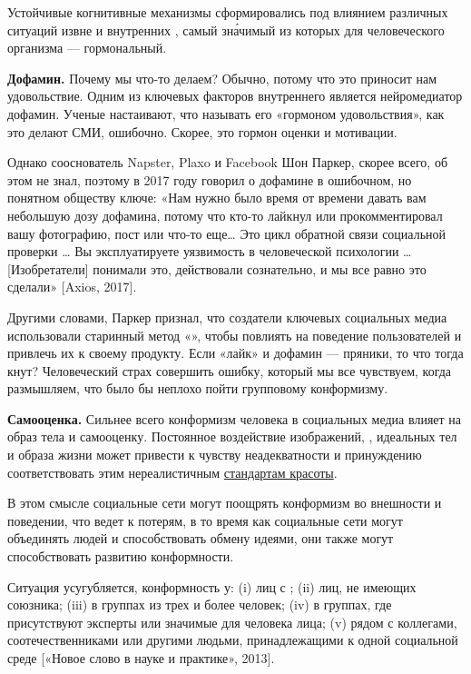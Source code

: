 Устойчивые когнитивные механизмы сформировались под влиянием различных ситуаций извне и внутренних , самый зн\'{а}чимый из которых для человеческого организма --- гормональный.

\textbf{Дофамин.}
Почему мы что-то делаем? Обычно, потому что это приносит нам удовольствие. Одним из ключевых факторов внутреннего  является нейромедиатор дофамин. Ученые настаивают, что называть его «гормоном удовольствия», как это делают СМИ, ошибочно. Скорее, это гормон оценки и мотивации.

Однако сооснователь Napster, Plaxo и Facebook Шон Паркер, скорее всего, об этом не знал, поэтому в 2017 году говорил о дофамине в ошибочном, но понятном обществу ключе: «Нам нужно было время от времени давать вам небольшую дозу дофамина, потому что кто-то лайкнул или прокомментировал вашу фотографию, пост или что-то еще… Это цикл обратной связи социальной проверки … Вы эксплуатируете уязвимость в человеческой психологии … [Изобретатели] понимали это, действовали сознательно, и мы все равно это сделали» [Axios, 2017].

Другими словами, Паркер признал, что создатели ключевых социальных медиа использовали старинный метод «», чтобы повлиять на поведение пользователей и привлечь их к своему продукту. Если «лайк» и дофамин --- пряники, то что тогда кнут? Человеческий страх совершить  ошибку, который мы все чувствуем, когда размышляем, что было бы неплохо пойти  групповому конформизму.

\textbf{Самооценка.}
Сильнее всего конформизм человека в социальных медиа влияет на образ тела и самооценку. Постоянное воздействие изображений, , идеальных тел и образа жизни может привести к чувству неадекватности и принуждению соответствовать этим нереалистичным \href{https://4brain.ru/blog/%D0%BB%D1%83%D0%BA%D0%B8%D0%B7%D0%BC-%D0%B8%D0%BB%D0%B8-face-fascism/}{стандартам красоты}.

В этом смысле социальные сети могут поощрять конформизм во внешности и поведении, что ведет к потерям, в то время как социальные сети могут объединять людей и способствовать обмену идеями, они также могут способствовать развитию конформности.

Ситуация усугубляется, конформность  у:
(i) лиц с ;
(ii) лиц, не имеющих союзника;
(iii) в группах из трех и более человек;
(iv) в группах, где присутствуют эксперты или значимые для человека лица;
(v) рядом с коллегами, соотечественниками или другими людьми, принадлежащими к одной социальной среде [«Новое слово в науке и практике», 2013].

